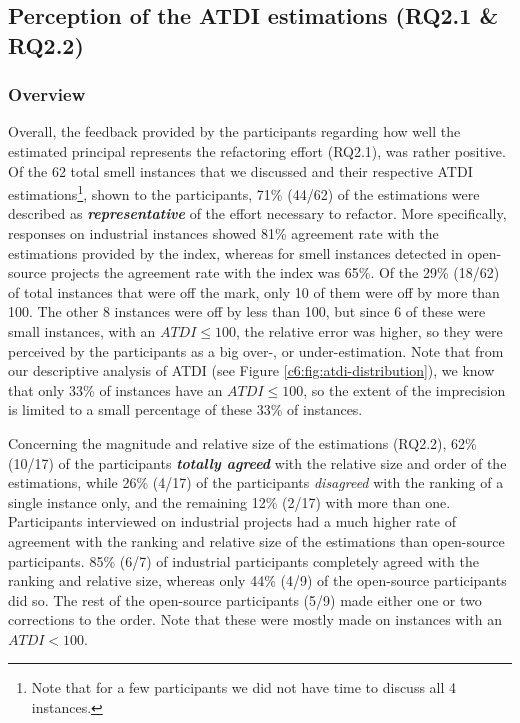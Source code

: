 \subsection{Perception of the ATDI estimations (RQ2.1 \& RQ2.2)}
\subsubsection{Overview}
Overall, the feedback provided by the participants regarding how well the estimated principal represents the refactoring effort (RQ2.1), was rather positive.
Of the 62 total smell instances that we discussed and their respective ATDI estimations\footnote{Note that for a few participants we did not have time to discuss all 4 instances.}, shown to the participants, 71\% (44/62) of the estimations were described as \emph{\textbf{representative}} of the effort necessary to refactor.
More specifically, responses on industrial instances showed 81\% agreement rate with the estimations provided by the index, whereas for smell instances detected in open-source projects the agreement rate with the index was 65\%.
Of the 29\% (18/62) of total instances that were off the mark, only 10 of them were off by more than 100. 
The other 8 instances were off by less than 100, but since 6 of these were small instances, with an $ATDI \le 100$, the relative error was higher, so they were perceived by the participants as a big over-, or under-estimation.
Note that from our descriptive analysis of ATDI (see Figure \ref{c6:fig:atdi-distribution}), we know that only 33\% of instances have an $ATDI \le 100$, so the extent of the imprecision is limited to a small percentage of these 33\% of instances.

Concerning the magnitude and relative size of the estimations (RQ2.2), 62\% (10/17) of the participants \emph{\textbf{totally agreed}} with the relative size and order of the estimations, while 26\% (4/17) of the participants \emph{disagreed} with the ranking of a single instance only, and the remaining 12\% (2/17) with more than one.
Participants interviewed on industrial projects had a much higher rate of agreement with the ranking and relative size of the estimations than open-source participants.
85\% (6/7) of industrial participants completely agreed with the ranking and relative size, whereas only 44\% (4/9) of the open-source participants did so.
The rest of the open-source participants (5/9) made either one or two corrections to the order.
Note that these were mostly made on instances with an $ATDI < 100$.

